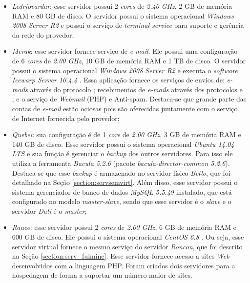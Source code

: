 \begin{itemize}
 \item \textit{Ledriovardar}: esse servidor possui 2 \textit{cores} de \textit{2.40 GHz}, 2 GB de memória \ac{RAM} e 80 GB de disco. 
 O servidor possui o sistema operacional \textit{Windows 2008 Server R2} e possui o serviço de \textit{terminal service} para suporte e gerência 
 da rede do provedor;
 
 \item \textit{Merak}: esse servidor fornece serviço de \textit{e-mail}. Ele possui uma configuração de 6 \textit{cores} de \textit{2.00 GHz}, 
 10 GB de memória \ac{RAM} e 1 TB de disco. O servidor possui o sistema operacional \textit{Windows 2008 Server R2} e executa o \textit{software} 
 \textit{Icewarp Server 10.4.4} \cite{icewarp}. Essa aplicação fornece os serviços de envios de: \textit{e-mails} através do protocolo 
  \cite{kurose2006}; recebimentos de \textit{e-mails} através dos protocolos  \cite{kurose2006} e  \cite{kurose2006}; 
 e o serviço de \textit{Webmail} (\ac{PHP}) e Anti-spam. Destaca-se que grande parte das contas de \textit{e-mail} estão ociosas pois são oferecidas 
 juntamente com o serviço de Internet fornecida pelo provedor;
 
 \item \textit{Quebei}: sua configuração é de 1 \textit{core} de \textit{2.00 GHz}, 3 GB de memória \ac{RAM} e 140 GB de disco. 
 Esse servidor possui o sistema operacional \textit{Ubuntu 14.04 \ac{LTS}} \cite{ubuntu} e sua função é gerenciar o \textit{backup} dos outros 
 servidores. Para isso ele utiliza a ferramenta \textit{Bacula 5.2.6} \cite{bacula} (pacote \textit{bacula-director-common 5.2.6}). Destaca-se
 que esse \textit{backup} é armazenado no servidor físico \textit{Bello}, que foi detalhado na Seção \ref{section:servsemvirt}. Além disso, 
 esse servidor possui o sistema gerenciador de banco de dados \textit{MySQL 5.5.49} \cite{mysql} instalado, que está configurado no modelo 
 \textit{master-slave}, sendo que esse servidor é o \textit{slave} e o servidor \textit{Dati} é o \textit{master};
 
 \item \textit{Rauco}: esse servidor possui 2 \textit{cores} de \textit{2.00 GHz}, 6 GB de memória \ac{RAM} e 600 GB de disco. 
 Ele possui o sistema operacional \textit{CentOS 6.8} \cite{centos}. Ou seja, esse servidor virtual fornece o mesmo serviço do servidor 
 \textit{Roncon}, que foi descrito na Seção \ref{section:serv_fulmine}. Esse servidor fornece acesso a sites \textit{Web} desenvolvidos com a 
 linguagem \ac{PHP}. Foram criados dois servidores para a hospedagem de forma a suportar um número maior de sites.
\end{itemize}


